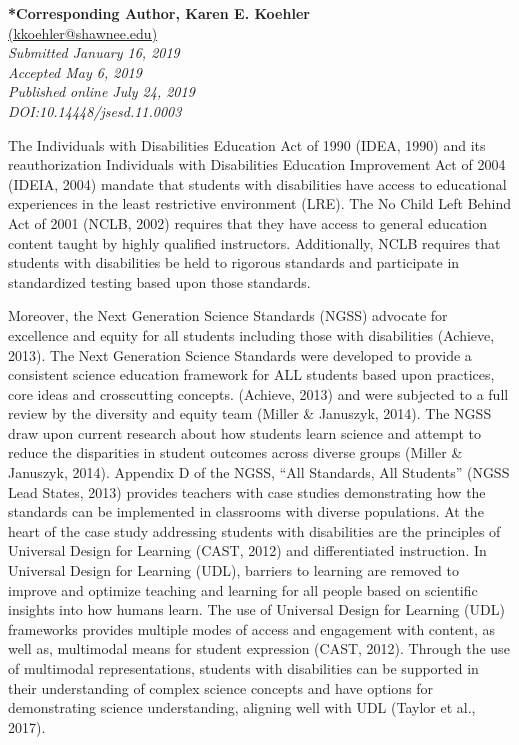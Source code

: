 \documentclass[11.5pt]{sig-alternate} %
\begin{document}
\textbf{*Corresponding Author, Karen E. Koehler}\\
\href{mailto: kkoehler@shawnee.edu }{(kkoehler@shawnee.edu)} \\
\textit{Submitted January 16, 2019 }\\
\textit{Accepted May 6, 2019} \\
\textit{Published online July 24, 2019} \\
\textit{DOI:10.14448/jsesd.11.0003} \\
\pagebreak
\clearpage
\begin{large}

The Individuals with Disabilities Education Act of 1990 (IDEA, 1990) and its reauthorization Individuals with Disabilities Education Improvement Act of 2004 (IDEIA, 2004) mandate that students with disabilities have access to educational experiences in the least restrictive environment (LRE).  The No Child Left Behind Act of 2001 (NCLB, 2002) requires that they have access to general education content taught by highly qualified instructors.  Additionally, NCLB requires that students with disabilities be held to rigorous standards and participate in standardized testing based upon those standards.  

Moreover, the Next Generation Science Standards (NGSS) advocate for excellence and equity for all students including those with disabilities (Achieve, 2013).  The Next Generation Science Standards were developed to provide a consistent science education framework for ALL students based upon practices, core ideas and crosscutting concepts. (Achieve, 2013) and were subjected to a full review by the diversity and equity team (Miller \& Januszyk, 2014).  The NGSS draw upon current research about how students learn science and attempt to reduce the disparities in student outcomes across diverse groups (Miller \& Januszyk, 2014).  Appendix D of the NGSS, “All Standards, All Students” (NGSS Lead States, 2013) provides teachers with case studies demonstrating how the standards can be implemented in classrooms with diverse populations. At the heart of the case study addressing students with disabilities are the principles of Universal Design for Learning (CAST, 2012) and differentiated instruction. In Universal Design for Learning (UDL), barriers to learning are removed to improve and optimize teaching and learning for all people based on scientific insights into how humans learn. The use of Universal Design for Learning (UDL) frameworks provides multiple modes of access and engagement with content, as well as, multimodal means for student expression (CAST, 2012).  Through the use of multimodal representations, students with disabilities can be supported in their understanding of complex science concepts and have options for demonstrating science understanding, aligning well with UDL (Taylor et al., 2017).  


\end{large}
\end{document}
